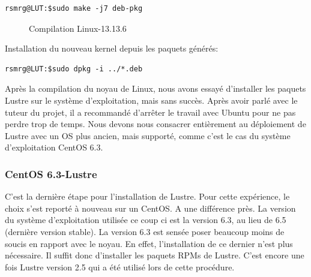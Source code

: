 \documentclass[12pt]{article}
\begin{document}
\begin{verbatim}
rsmrg@LUT:$sudo make -j7 deb-pkg
\end{verbatim}

\begin{figure}[Compilation]
\caption{Compilation Linux-13.13.6}
\label{kernel}
\end{figure}

Installation du nouveau kernel depuis les paquets générés:

\begin{verbatim}
rsmrg@LUT:$sudo dpkg -i ../*.deb
\end{verbatim}

Après la compilation du noyau de Linux, nous avons essayé d'installer les paquets Lustre sur le système d'exploitation, mais sans succès. Après avoir parlé avec le tuteur du projet, il a recommandé d'arrêter le travail avec Ubuntu pour ne pas perdre trop de temps. Nous devons nous consacrer entièrement au déploiement de Lustre avec un OS plus ancien, mais supporté, comme c'est le cas du système d'exploitation CentOS 6.3.

\newpage
\subsubsection{CentOS 6.3-Lustre}
C'est la dernière étape pour l'installation de Lustre. Pour cette expérience, le choix s'est reporté à nouveau sur un CentOS. A une différence près. La version du système d'exploitation utilisée ce coup ci est la version 6.3, au lieu de 6.5 (dernière version stable). La version 6.3 est sensée poser beaucoup moins de soucis en rapport avec le noyau. En effet, l'installation de ce dernier n'est plus nécessaire. Il suffit donc d'installer les paquets RPMs de Lustre. C'est encore une fois Lustre version 2.5 qui a été utilisé lors de cette procédure. 
\end{document}
